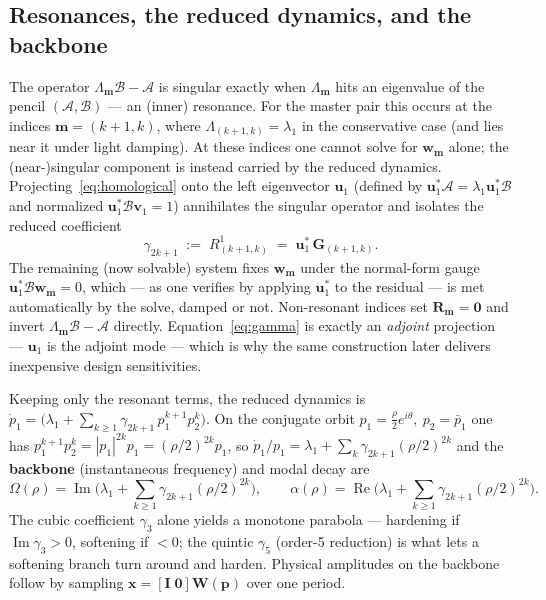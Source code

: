 \documentclass[11pt]{article}
\newcommand{\Om}{\Omega}
\DeclareMathOperator{\Imag}{Im}
\DeclareMathOperator{\Real}{Re}
\begin{document}
\subsection{Resonances, the reduced dynamics, and the backbone}
The operator $\Lambda_{\bm m}\bm{\mathcal B}-\bm{\mathcal A}$ is singular exactly
when $\Lambda_{\bm m}$ hits an eigenvalue of the pencil $(\bm{\mathcal A},
\bm{\mathcal B})$ --- an (inner) resonance. For the master pair this occurs at the
indices $\bm m=(k{+}1,k)$, where $\Lambda_{(k+1,k)}=\lambda_1$ in the
conservative case (and lies near it under light damping). At these indices one
cannot solve for $\bm w_{\bm m}$ alone; the (near-)singular component is instead
carried by the reduced dynamics. Projecting~\eqref{eq:homological} onto the left
eigenvector $\bm u_1$ (defined by $\bm u_1^{*}\bm{\mathcal A}=\lambda_1
\bm u_1^{*}\bm{\mathcal B}$ and normalized $\bm u_1^{*}\bm{\mathcal B}\bm v_1=1$)
annihilates the singular operator and isolates the reduced coefficient
\begin{equation}
\gamma_{2k+1}\;:=\;R^1_{(k+1,k)}\;=\;\bm u_1^{*}\,\bm G_{(k+1,k)} .
\label{eq:gamma}
\end{equation}
The remaining (now solvable) system fixes $\bm w_{\bm m}$ under the normal-form
gauge $\bm u_1^{*}\bm{\mathcal B}\bm w_{\bm m}=0$, which --- as one verifies by
applying $\bm u_1^{*}$ to the residual --- is met automatically by the solve,
damped or not. Non-resonant indices set $\bm R_{\bm m}=\bm 0$ and invert
$\Lambda_{\bm m}\bm{\mathcal B}-\bm{\mathcal A}$ directly. Equation~\eqref{eq:gamma}
is exactly an \emph{adjoint} projection --- $\bm u_1$ is the adjoint mode --- which
is why the same construction later delivers inexpensive design sensitivities.

Keeping only the resonant terms, the reduced dynamics is
$\dot p_1=\big(\lambda_1+\sum_{k\ge1}\gamma_{2k+1}\,p_1^{k+1}p_2^{k}\big)$. On the
conjugate orbit $p_1=\tfrac{\rho}{2}e^{i\theta},\ p_2=\bar p_1$ one has
$p_1^{k+1}p_2^{k}=|p_1|^{2k}p_1=(\rho/2)^{2k}p_1$, so
$\dot p_1/p_1=\lambda_1+\sum_k\gamma_{2k+1}(\rho/2)^{2k}$ and the \textbf{backbone}
(instantaneous frequency) and modal decay are
\begin{equation}
\Om(\rho)=\Imag\!\Big(\lambda_1+\!\sum_{k\ge1}\gamma_{2k+1}(\rho/2)^{2k}\Big),
\qquad
\alpha(\rho)=\Real\!\Big(\lambda_1+\!\sum_{k\ge1}\gamma_{2k+1}(\rho/2)^{2k}\Big).
\label{eq:backbone}
\end{equation}
The cubic coefficient $\gamma_3$ alone yields a monotone parabola --- hardening if
$\Imag\gamma_3>0$, softening if $<0$; the quintic $\gamma_5$ (order-5 reduction) is
what lets a softening branch turn around and harden. Physical amplitudes on the
backbone follow by sampling $\bm x=[\bm I\;\bm0]\bm W(\bm p)$ over one period.
\end{document}
